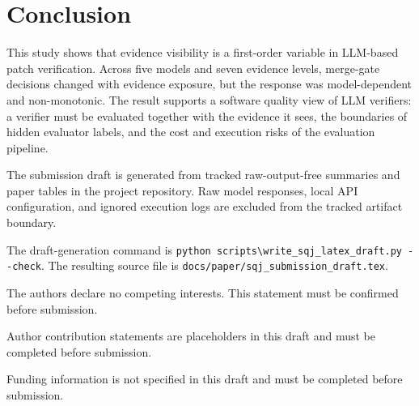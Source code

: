 \documentclass[pdflatex,sn-basic]{sn-jnl}
\begin{document}
\section{Conclusion}

This study shows that evidence visibility is a first-order variable in
LLM-based patch verification. Across five models and seven evidence levels,
merge-gate decisions changed with evidence exposure, but the response was
model-dependent and non-monotonic. The result supports a software quality view
of LLM verifiers: a verifier must be evaluated together with the evidence it
sees, the boundaries of hidden evaluator labels, and the cost and execution
risks of the evaluation pipeline.

\backmatter


The submission draft is generated from tracked raw-output-free summaries and
paper tables in the project repository. Raw model responses, local API
configuration, and ignored execution logs are excluded from the tracked
artifact boundary.


The draft-generation command is \verb|python scripts\write_sqj_latex_draft.py --check|.
The resulting source file is \verb|docs/paper/sqj_submission_draft.tex|.


The authors declare no competing interests. This statement must be confirmed
before submission.


Author contribution statements are placeholders in this draft and must be
completed before submission.


Funding information is not specified in this draft and must be completed before
submission.


\end{document}
